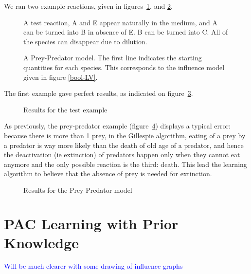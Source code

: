 \documentclass{llncs}
\newcommand{\francois}[1]{\textcolor{blue}{#1}}
\begin{document}


We ran two example reactions, given in figures~\ref{test}, and \ref{preypred}.

\begin{figure}[htbp]
	
	\vspace{-1em}
	\caption{A test reaction, A and E appear naturally in the medium, and A can be turned into B in absence of E. B  can be turned into C. All of the species can disappear due to dilution.\label{test}}
\end{figure}
\begin{figure}[htbp]
	
	\vspace{-1em}
	\caption{A Prey-Predator model. The first line indicates the starting quantities for each species. This corresponds to the influence model given in figure \ref{bool-LV}.\label{preypred}}
\end{figure}

The first example gave perfect results, as indicated on figure~\ref{test_res}.
\begin{figure}
	
	\caption{Results for the test example\label{test_res}}
\end{figure}

As previously, the prey-predator example (figure~\ref{preypred_res}) displays a typical error: because there is more than 1 prey, in the Gillespie algorithm, eating of a prey by a predator is way more likely than the death of old age of a predator, and hence the deactivation (ie extinction) of predators happen only when they cannot eat anymore and the only possible reaction is the third: death. This lead the learning algorithm to believe that the absence of prey is needed for extinction.
\begin{figure}
	
	\caption{Results for the Prey-Predator model\label{preypred_res}}
\end{figure}

\section{PAC Learning with Prior Knowledge}

\francois{Will be much clearer with some drawing of influence graphs}
\end{document}
